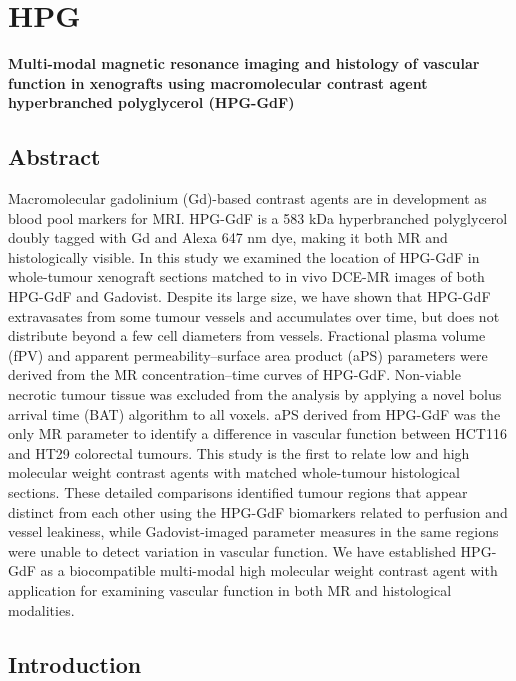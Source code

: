 
\chapter{HPG}
\label{ch:HPG}

\textbf{Multi-modal magnetic resonance imaging and histology of vascular function in xenografts using macromolecular contrast agent hyperbranched polyglycerol (HPG-GdF)}

\section{Abstract}

Macromolecular gadolinium (Gd)-based contrast agents are in development as blood pool markers for MRI.
HPG-GdF is a 583 kDa hyperbranched polyglycerol doubly tagged with Gd and Alexa 647 nm dye, making it both MR and histologically visible.
In this study we examined the location of HPG-GdF in whole-tumour xenograft sections matched to in vivo DCE-MR images of both HPG-GdF and Gadovist.
Despite its large size, we have shown that HPG-GdF extravasates from some tumour vessels and accumulates over time, but does not distribute beyond a few cell diameters from vessels.
Fractional plasma volume (fPV) and apparent permeability–surface area product (aPS) parameters were derived from the MR concentration–time curves of HPG-GdF.
Non-viable necrotic tumour tissue was excluded from the analysis by applying a novel bolus arrival time (BAT) algorithm to all voxels.
aPS derived from HPG-GdF was the only MR parameter to identify a difference in vascular function between HCT116 and HT29 colorectal tumours.
This study is the first to relate low and high molecular weight contrast agents with matched whole-tumour histological sections.
These detailed comparisons identified tumour regions that appear distinct from each other using the HPG-GdF biomarkers related to perfusion and vessel leakiness, while Gadovist-imaged parameter measures in the same regions were unable to detect variation in vascular function.
We have established HPG-GdF as a biocompatible multi-modal high molecular weight contrast agent with application for examining vascular function in both MR and histological modalities.

\section{Introduction}

